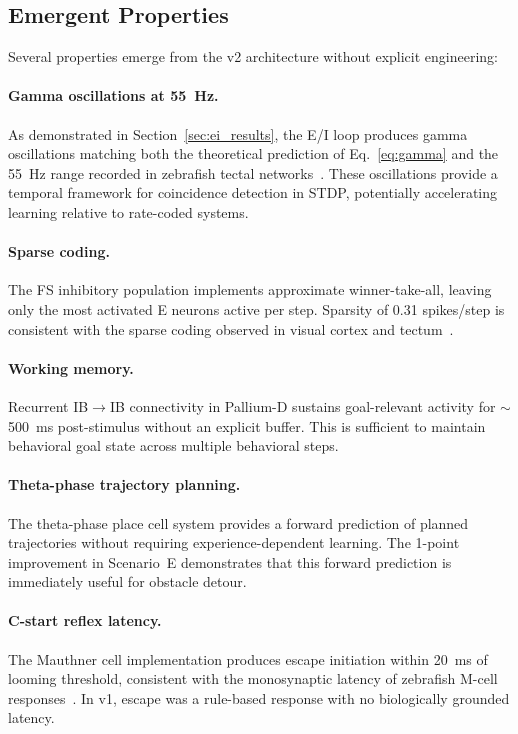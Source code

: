 \documentclass[11pt,a4paper]{article}
\begin{document}
\subsection{Emergent Properties}\label{sec:emergent}

Several properties emerge from the v2 architecture without explicit engineering:

\paragraph{Gamma oscillations at 55~Hz.}
As demonstrated in Section~\ref{sec:ei_results}, the E/I loop produces
gamma oscillations matching both the theoretical prediction of
Eq.~\ref{eq:gamma} and the 55~Hz range recorded in zebrafish tectal
networks~\cite{portugues2014}.
These oscillations provide a temporal framework for coincidence detection
in STDP, potentially accelerating learning relative to rate-coded systems.

\paragraph{Sparse coding.}
The FS inhibitory population implements approximate winner-take-all,
leaving only the most activated E neurons active per step.
Sparsity of 0.31 spikes/step is consistent with the sparse coding
observed in visual cortex and tectum~\cite{carandini2012}.

\paragraph{Working memory.}
Recurrent IB$\to$IB connectivity in Pallium-D sustains goal-relevant
activity for $\sim$500~ms post-stimulus without an explicit buffer.
This is sufficient to maintain behavioral goal state across multiple
behavioral steps.

\paragraph{Theta-phase trajectory planning.}
The theta-phase place cell system provides a forward prediction of
planned trajectories without requiring experience-dependent learning.
The 1-point improvement in Scenario~E demonstrates that this forward
prediction is immediately useful for obstacle detour.

\paragraph{C-start reflex latency.}
The Mauthner cell implementation produces escape initiation within
20~ms of looming threshold, consistent with the monosynaptic latency
of zebrafish M-cell responses~\cite{temizer2015}.
In v1, escape was a rule-based response with no biologically grounded
latency.
\end{document}
